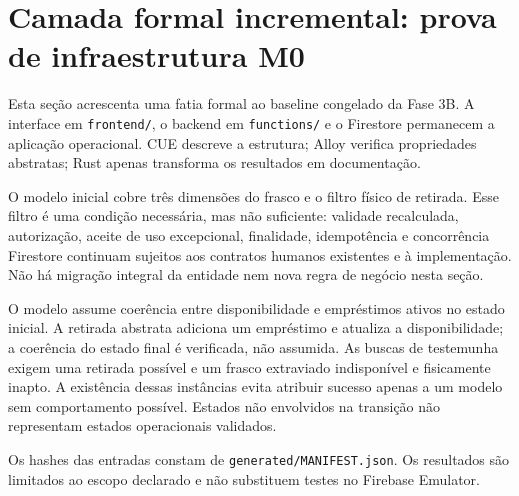 \clearpage
\section{Camada formal incremental: prova de infraestrutura M0}
Esta seção acrescenta uma fatia formal ao baseline congelado da Fase 3B.
A interface em \texttt{frontend/}, o backend em \texttt{functions/} e o
Firestore permanecem a aplicação operacional. CUE descreve a estrutura;
Alloy verifica propriedades abstratas; Rust apenas transforma os resultados
em documentação.

O modelo inicial cobre três dimensões do frasco e o filtro físico de retirada.
Esse filtro é uma condição necessária, mas não suficiente: validade recalculada,
autorização, aceite de uso excepcional, finalidade, idempotência e concorrência
Firestore continuam sujeitos aos contratos humanos existentes e à implementação.
Não há migração integral da entidade nem nova regra de negócio nesta seção.




O modelo assume coerência entre disponibilidade e empréstimos ativos no estado
inicial. A retirada abstrata adiciona um empréstimo e atualiza a disponibilidade;
a coerência do estado final é verificada, não assumida. As buscas de testemunha
exigem uma retirada possível e um frasco extraviado indisponível e fisicamente
inapto. A existência dessas instâncias evita atribuir sucesso apenas a um
modelo sem comportamento possível. Estados não envolvidos na transição não
representam estados operacionais validados.

Os hashes das entradas constam de \texttt{generated/MANIFEST.json}.
Os resultados são limitados
ao escopo declarado e não substituem testes no Firebase Emulator.
